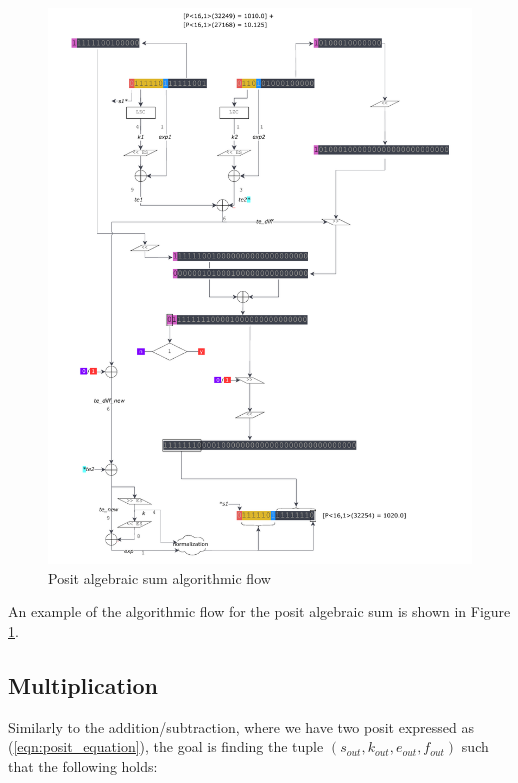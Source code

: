 \begin{figure}
    \begin{center}
    \includegraphics[width=\textwidth]{figures/addition_flow.pdf}
    \caption{Posit algebraic sum algorithmic flow}
    \label{fig:additionflow}
    \end{center}
\end{figure}

An example of the algorithmic flow for the posit algebraic sum is shown in Figure \ref{fig:additionflow}.

\subsection{Multiplication}\label{Multiplication}

Similarly to the addition/subtraction, where we have two posit expressed as (\ref{eqn:posit_equation}), the goal is finding the tuple $(s_{out}, k_{out}, e_{out}, f_{out})$ such that the following holds:


